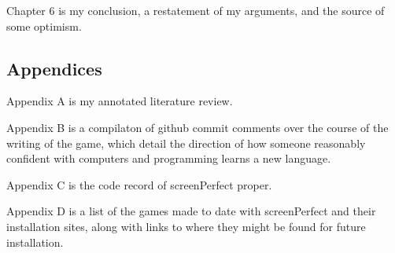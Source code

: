 Chapter 6 is my conclusion, a restatement of my arguments, and the source of some optimism.

\subsection{Appendices}
Appendix A is my annotated literature review.

Appendix B is a compilaton of github commit comments over the course of the writing of the game, which detail the direction of how someone reasonably confident with computers and programming learns a new language. 

Appendix C is the code record of screenPerfect proper.

Appendix D is a list of the games made to date with screenPerfect and their installation sites, along with links to where they might be found for future installation.
